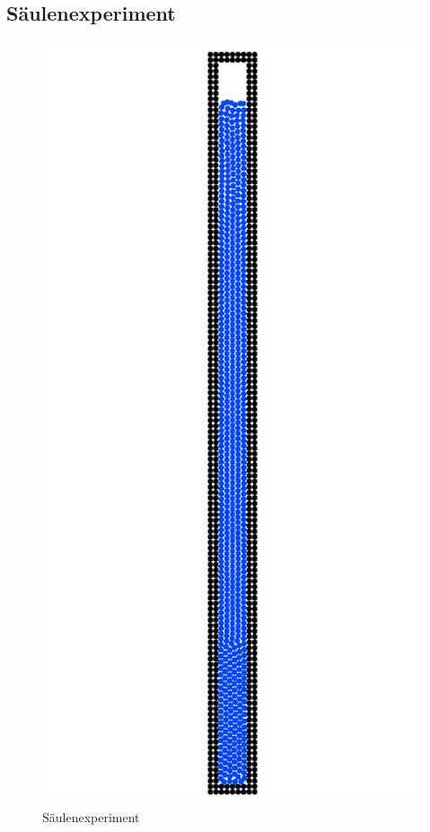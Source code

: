 \documentclass[a4paper, 12pt]{article}
\begin{document}
\subsection{Säulenexperiment}

\begin{figure}
	\includegraphics[width=\linewidth]{graphics/20240813135808.png} 
	\caption{Säulenexperiment}
	\label{Säulenexperiment}
\end{figure}
\end{document}
